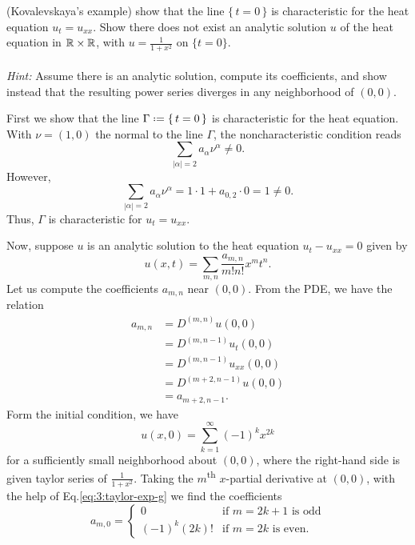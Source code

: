 \begin{problem}
  (Kovalevskaya's example) show that the line \(\{\,t=0\,\}\) is
  characteristic for the heat equation \(u_t=u_{xx}\). Show there does not
  exist an analytic solution \(u\) of the heat equation in \(\mathbb{R}\times\mathbb{R}\),
  with \(u=\frac{1}{1+x^2}\) on \(\{t=0\}\).
  \\\\
  \emph{Hint:} Assume there is an analytic solution, compute its
  coefficients, and show instead that the resulting power series diverges
  in any neighborhood of \((0,0)\).
\end{problem}
\begin{solution*}
  First we show that the line \(\Gamma\defeq\{\,t=0\,\}\) is characteristic
  for the heat equation. With \(\nu=(1,0)\) the normal to the line
  \(\Gamma\), the noncharacteristic condition reads
  \[
    \sum_{|\alpha|=2} a_\alpha\nu^\alpha\neq 0.
  \]
  However,
  \[
    \sum_{|\alpha|=2} a_\alpha\nu^\alpha=%
    1\cdot 1+a_{0,2}\cdot 0=%
    1\neq%
    0.
  \]
  Thus, \(\Gamma\) is characteristic for \(u_t=u_{xx}\).

  Now, suppose \(u\) is an analytic solution to the heat equation
  \(u_t-u_{xx}=0\) given by
  \[
    u(x,t)=\sum_{m,n} \frac{a_{m,n}}{m!n!}x^mt^n.
  \]
  Let us compute the coefficients \(a_{m,n}\) near \((0,0)\). From the PDE,
  we have the relation
  \begin{equation}
    \label{eq:3:pde-relation}
    \begin{aligned}
      a_{m,n}
      &=D^{(m,n)} u(0,0)\\
      &=D^{(m,n-1)}u_t(0,0)\\
      &=D^{(m,n-1)}u_{xx}(0,0)\\
      &=D^{(m+2,n-1)}u(0,0)\\
      &=a_{m+2,n-1}.
    \end{aligned}
  \end{equation}
  Form the initial condition, we have
  \begin{equation}
    \label{eq:3:taylor-exp-g}
    u(x,0)=\sum_{k=1}^\infty (-1)^k x^{2k}
  \end{equation}
  for a sufficiently small neighborhood about \((0,0)\), where the
  right-hand side is given taylor series of \(\frac{1}{1+x^2}\). Taking the
  \(m\)\textsuperscript{th} \(x\)-partial derivative at \((0,0)\), with the
  help of Eq.\@ \eqref{eq:3:taylor-exp-g} we find the coefficients
  \begin{equation}
    \label{eq:3:boundary-relation}
    a_{m,0}=
    \begin{cases}
      0&\text{if \(m=2k+1\) is odd}\\
      (-1)^k(2k)!&\text{if \(m=2k\) is even.}
    \end{cases}
  \end{equation}


\end{solution*}
